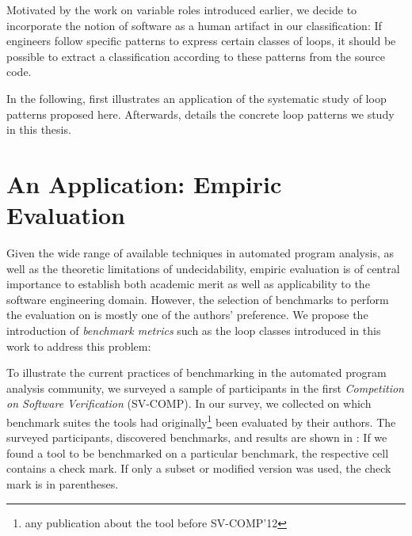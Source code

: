 Motivated by the work on variable roles introduced earlier, we decide to incorporate the notion of software as a human artifact in our classification: If engineers follow specific patterns to express certain classes of loops, it should be possible to extract a classification according to these patterns from the source code.

In the following,  first illustrates an application of the systematic study of loop patterns proposed here. Afterwards,  details the concrete loop patterns we study in this thesis.

\section{An Application: Empiric Evaluation}
\label{sec:app_emp_eval}

Given the wide range of available techniques in automated program analysis, as well as the theoretic limitations of undecidability, empiric evaluation is of central importance to establish both academic merit as well as applicability to the software engineering domain. However, the selection of benchmarks to perform the evaluation on is mostly one of the authors' preference. We propose the introduction of \emph{benchmark metrics} such as the loop classes introduced in this work to address this problem:

To illustrate the current practices of benchmarking in the automated program analysis community, we surveyed a sample of participants in the first \emph{Competition on Software Verification} (SV-COMP). In our survey, we collected on which benchmark suites the tools had originally\footnote{any publication about the tool before SV-COMP'12} been evaluated by their authors. The surveyed participants, discovered benchmarks, and results are shown in : If we found a tool to be benchmarked on a particular benchmark, the respective cell contains a check mark. If only a subset or modified version was used, the check mark is in parentheses.

